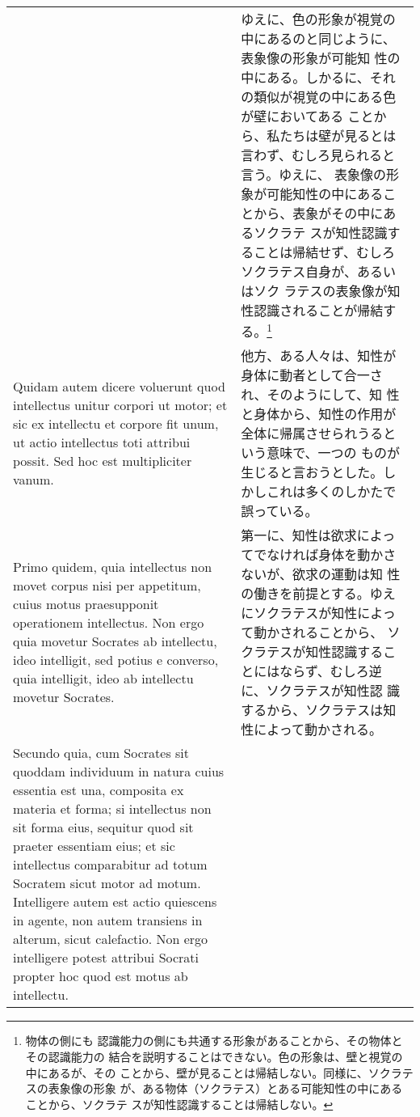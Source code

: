 \documentclass[paper=a4paper,fontsize=10pt,jafontsize=9pt,titlepage]{jlreq}
\begin{document}
\begin{longtable}{p{21em}p{21em}}
 &

 ゆえに、色の形象が視覚の中にあるのと同じように、表象像の形象が可能知
 性の中にある。しかるに、それの類似が視覚の中にある色が壁においてある
 ことから、私たちは壁が見るとは言わず、むしろ見られると言う。ゆえに、
 表象像の形象が可能知性の中にあることから、表象がその中にあるソクラテ
 スが知性認識することは帰結せず、むしろソクラテス自身が、あるいはソク
 ラテスの表象像が知性認識されることが帰結する。\footnote{物体の側にも
 認識能力の側にも共通する形象があることから、その物体とその認識能力の
 結合を説明することはできない。色の形象は、壁と視覚の中にあるが、その
 ことから、壁が見ることは帰結しない。同様に、ソクラテスの表象像の形象
 が、ある物体（ソクラテス）とある可能知性の中にあることから、ソクラテ
 スが知性認識することは帰結しない。}

\\

 Quidam autem dicere voluerunt quod intellectus unitur corpori ut
 motor; et sic ex intellectu et corpore fit unum, ut actio intellectus
 toti attribui possit. Sed hoc est multipliciter vanum.
 
&

 他方、ある人々は、知性が身体に動者として合一され、そのようにして、知
 性と身体から、知性の作用が全体に帰属させられうるという意味で、一つの
 ものが生じると言おうとした。しかしこれは多くのしかたで誤っている。
 
\\


 Primo quidem, quia intellectus non movet corpus nisi per appetitum,
 cuius motus praesupponit operationem intellectus. Non ergo quia
 movetur Socrates ab intellectu, ideo intelligit, sed potius e
 converso, quia intelligit, ideo ab intellectu movetur Socrates.
 
&

第一に、知性は欲求によってでなければ身体を動かさないが、欲求の運動は知
性の働きを前提とする。ゆえにソクラテスが知性によって動かされることから、
ソクラテスが知性認識することにはならず、むしろ逆に、ソクラテスが知性認
識するから、ソクラテスは知性によって動かされる。
 
\\


Secundo quia, cum Socrates sit quoddam individuum in natura cuius
essentia est una, composita ex materia et forma; si intellectus non
sit forma eius, sequitur quod sit praeter essentiam eius; et sic
intellectus comparabitur ad totum Socratem sicut motor ad
motum. Intelligere autem est actio quiescens in agente, non autem
transiens in alterum, sicut calefactio. Non ergo intelligere potest
attribui Socrati propter hoc quod est motus ab intellectu.
 

\end{longtable}
\end{document}
